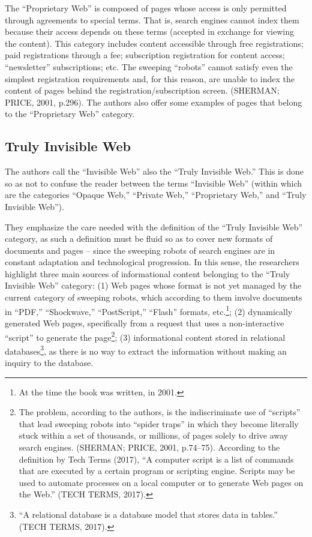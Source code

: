 The ``Proprietary Web'' is composed of pages whose access is only permitted through agreements to special terms. That is, search engines cannot index them because their access depends on these terms (accepted in exchange for viewing the content). This category includes content accessible through free registrations; paid registrations through a fee; subscription registration for content access; ``newsletter'' subscriptions; etc. The sweeping ``robots'' cannot satisfy even the simplest registration requirements and, for this reason, are unable to index the content of pages behind the registration/subscription screen. (SHERMAN; PRICE, 2001, p.296). The authors also offer some examples of pages that belong to the ``Proprietary Web'' category.

\subsection{Truly Invisible Web}

The authors call the ``Invisible Web'' also the ``Truly Invisible Web.'' This is done so as not to confuse the reader between the terms ``Invisible Web'' (within which are the categories ``Opaque Web,'' ``Private Web,'' ``Proprietary Web,'' and ``Truly Invisible Web'').

They emphasize the care needed with the definition of the ``Truly Invisible Web'' category, as such a definition must be fluid so as to cover new formats of documents and pages -- since the sweeping robots of search engines are in constant adaptation and technological progression. In this sense, the researchers highlight three main sources of informational content belonging to the ``Truly Invisible Web'' category: (1) Web pages whose format is not yet managed by the current category of sweeping robots, which according to them involve documents in ``PDF,'' ``Shockwave,'' ``PostScript,'' ``Flash'' formats, etc.\footnote{At the time the book was written, in 2001.}; (2) dynamically generated Web pages, specifically from a request that uses a non-interactive ``script'' to generate the page\footnote{The problem, according to the authors, is the indiscriminate use of ``scripts'' that lead sweeping robots into ``spider traps'' in which they become literally stuck within a set of thousands, or millions, of pages solely to drive away search engines. (SHERMAN; PRICE, 2001, p.74--75). According to the definition by Tech Terms (2017), ``A computer script is a list of commands that are executed by a certain program or scripting engine. Scripts may be used to automate processes on a local computer or to generate Web pages on the Web.'' (TECH TERMS, 2017).}; (3) informational content stored in relational databases\footnote{``A relational database is a database model that stores data in tables.'' (TECH TERMS, 2017).}, as there is no way to extract the information without making an inquiry to the database.

